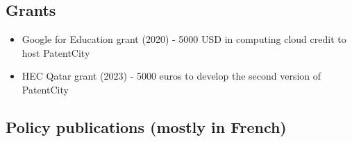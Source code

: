\documentclass[12pt]{article}
\begin{document}
\subsection*{Grants}

\begin{itemize}
\item Google for Education grant (2020) - 5000 USD in computing cloud credit to host PatentCity

\item HEC Qatar grant (2023) - 5000 euros to develop the second version of PatentCity
\end{itemize}

\subsection*{Policy publications (mostly in French)}
\end{document}
